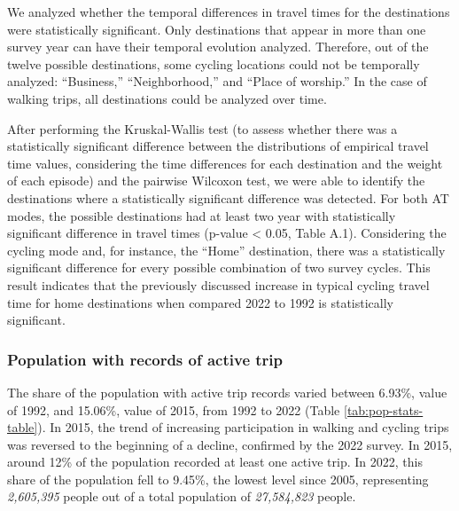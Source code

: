 \documentclass[preprint, 3p,
authoryear]{elsarticle} %
\begin{document}
We analyzed whether the temporal differences in travel times for the
destinations were statistically significant. Only destinations that
appear in more than one survey year can have their temporal evolution
analyzed. Therefore, out of the twelve possible destinations, some
cycling locations could not be temporally analyzed: ``Business,''
``Neighborhood,'' and ``Place of worship.'' In the case of walking
trips, all destinations could be analyzed over time.

After performing the Kruskal-Wallis test (to assess whether there was a
statistically significant difference between the distributions of
empirical travel time values, considering the time differences for each
destination and the weight of each episode) and the pairwise Wilcoxon
test, we were able to identify the destinations where a statistically
significant difference was detected. For both AT modes, the possible
destinations had at least two year with statistically significant
difference in travel times (p-value \textless{} 0.05, Table A.1).
Considering the cycling mode and, for instance, the ``Home''
destination, there was a statistically significant difference for every
possible combination of two survey cycles. This result indicates that
the previously discussed increase in typical cycling travel time for
home destinations when compared 2022 to 1992 is statistically
significant.

\subsubsection{Population with records of active
trip}\label{population-with-records-of-active-trip}

The share of the population with active trip records varied between
6.93\%, value of 1992, and 15.06\%, value of 2015, from 1992 to 2022
(Table \ref{tab:pop-stats-table}). In 2015, the trend of increasing
participation in walking and cycling trips was reversed to the beginning
of a decline, confirmed by the 2022 survey. In 2015, around 12\% of the
population recorded at least one active trip. In 2022, this share of the
population fell to 9.45\%, the lowest level since 2005, representing
\emph{2,605,395} people out of a total population of \emph{27,584,823}
people.
\end{document}
